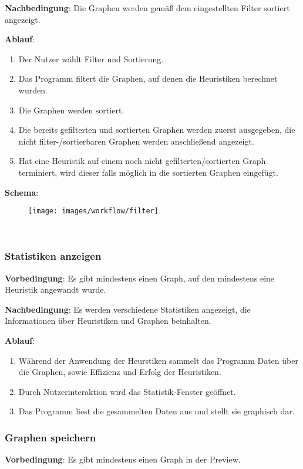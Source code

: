 \documentclass{article}
\begin{document}
	\textbf{Nachbedingung}: Die Graphen werden gemäß dem eingestellten Filter sortiert angezeigt.
	
	\textbf{Ablauf}:
	\begin{enumerate}[1)]
		\item{Der Nutzer wählt Filter und Sortierung.}
		\item{Das Programm filtert die Graphen, auf denen die Heuristiken berechnet wurden.}
		\item{Die Graphen werden sortiert.}
		\item{Die bereits gefilterten und sortierten Graphen werden zuerst ausgegeben, die nicht filter-/sortierbaren Graphen werden anschließend angezeigt.}
		\item{Hat eine Heuristik auf einem noch nicht gefilterten/sortierten Graph terminiert, wird dieser falls möglich in die sortierten Graphen eingefügt.}
	\end{enumerate}
	
	\textbf{Schema}:
	~\begin{figure}[!h]
		\centering
		\texttt{[image: images/workflow/filter]}
	\end{figure}
	
	
	
	\FloatBarrier
	~\newpage
	\subsubsection{Statistiken anzeigen}
	\textbf{Vorbedingung}: Es gibt mindestens einen Graph, auf den mindestens eine Heuristik angewandt wurde.
	
	\textbf{Nachbedingung}: Es werden verschiedene Statistiken angezeigt, die Informationen über Heuristiken und Graphen beinhalten.
	
	\textbf{Ablauf}:
	\begin{enumerate}[1)]
		\item{Während der Anwendung der Heurstiken sammelt das Programm Daten über die Graphen, sowie Effizienz und Erfolg der Heuristiken.}
		\item{Durch Nutzerinteraktion wird das Statistik-Fenster geöffnet.}
		\item{Das Programm liest die gesammelten Daten aus und stellt sie graphisch dar.}
	\end{enumerate}
	
	
	\subsubsection{Graphen speichern}
	\textbf{Vorbedingung}: Es gibt mindestens einen Graph in der Preview.
	
\end{document}
